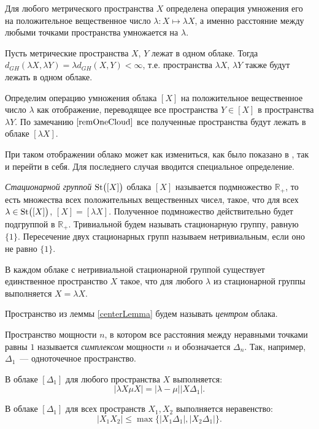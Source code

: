 Для любого метрического пространства $X$ определена операция умножения его
на положительное вещественное число $\lambda\colon X\mapsto \lambda X$, а именно
расстояние между любыми точками
пространства умножается на $\lambda$.
\begin{remark} Пусть метрические
  пространства $X$, $Y$ лежат в одном облаке. Тогда
  $d_{GH}(\lambda X, \lambda Y) = \lambda d_{GH}(X,Y) < \infty$, т.е.
  пространства
  $\lambda X$, $\lambda Y$ также будут лежать в одном облаке.
  \label{remOneCloud}
\end{remark}
\begin{defin}Определим операцию умножения облака $[X]$ на
  положительное вещественное
  число $\lambda$ как отображение, переводящее все пространства $Y \in [X]$ в
  пространства $\lambda Y$. По замечанию $\ref{remOneCloud}$ все
  полученные пространства будут
  лежать в облаке $[\lambda X]$.
\end{defin}
При таком отображении облако может как
измениться, как было показано в \cite{TuzhBog2}, так и перейти в
себя. Для последнего случая вводится специальное
определение.
\begin{defin}
    \emph{Стационарной группой} $\operatorname{St}\bigl([X]\bigr)$ облака $[X]$
  называется подмножество $\mathbb{R}_+$, то есть множества всех
  положительных вещественных чисел, такое, что для всех
  $\lambda \in \operatorname{St}\bigl([X]\bigr)$, $[X] = [\lambda X]$. Полученное подмножество
  действительно будет подгруппой в $\mathbb{R}_+$. Тривиальной
  будем называть стационарную группу, равную $\{1\}$. Пересечение
  двух стационарных групп называем нетривиальным, если оно не равно \( \{1\} \).
\end{defin}

\begin{lemma}
  В каждом облаке с нетривиальной стационарной группой существует единственное
  пространство $X$ такое, что для любого $\lambda$ из стационарной группы
  выполняется $X = \lambda X$.
  \label{centerLemma}
\end{lemma}
\begin{defin}
  Пространство из леммы \ref{centerLemma} будем называть \emph{центром} облака.
\end{defin}
\begin{defin}
    Пространство мощности \( n \), в котором все расстояния между неравными точками равны \( 1 \) называется  \emph{симплексом} мощности \( n \) и обозначается \( \Delta _n \). Так, например, \( \Delta _1 \)~--- одноточечное пространство.
\end{defin}
\begin{remark} В
  облаке $[\Delta_1]$ для любого пространства $X$ выполняется:
  $$|\lambda X \mu X| = |\lambda - \mu||X\Delta_1|.$$
\end{remark}
\begin{remark} В облаке
  $[\Delta_{1}]$ для всех пространств $X_{1}, X_{2}$ выполняется неравенство:
  $$|X_{1}X_{2}| \le \max\big\{|X_{1} \Delta_{1}|,|X_{2}\Delta_{1}|\big\}.$$
  \label{remUltraMetric}
\end{remark}

